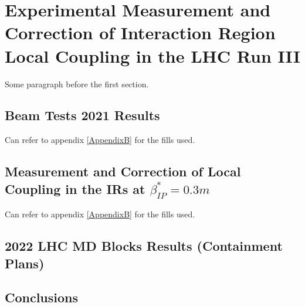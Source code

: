 
\chapter{Experimental Measurement and Correction of Interaction Region Local Coupling in the LHC Run III} %

\label{Chapter5} %


Some paragraph before the first section.


\section{Beam Tests 2021 Results}

Can refer to appendix \ref{AppendixB} for the fills used.

\section{Measurement and Correction of Local Coupling in the IRs at $\beta^{*}_{IP} = 0.3m$}

Can refer to appendix \ref{AppendixB} for the fills used.



\section{2022 LHC MD Blocks Results (Containment Plans)}


\section{Conclusions}

